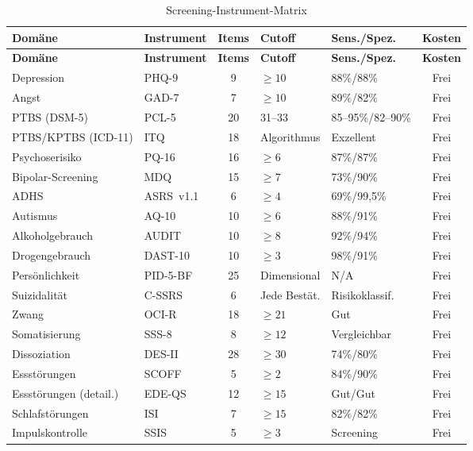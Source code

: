 \documentclass[11pt,a4paper]{article}
\begin{document}
\begin{longtable}{p{2.5cm}p{2.3cm}cp{1.5cm}p{2.5cm}c}
\caption{Screening-Instrument-Matrix} \label{tab:instrumente} \\
\toprule
\textbf{Dom\"ane} & \textbf{Instrument} & \textbf{Items} & \textbf{Cutoff} & \textbf{Sens./Spez.} & \textbf{Kosten} \\
\midrule
\endfirsthead
\toprule
\textbf{Dom\"ane} & \textbf{Instrument} & \textbf{Items} & \textbf{Cutoff} & \textbf{Sens./Spez.} & \textbf{Kosten} \\
\midrule
\endhead
Depression & PHQ-9 & 9 & $\geq 10$ & 88\%/88\% & Frei \\
\addlinespace
Angst & GAD-7 & 7 & $\geq 10$ & 89\%/82\% & Frei \\
\addlinespace
PTBS (DSM-5) & PCL-5 & 20 & 31--33 & 85--95\%/82--90\% & Frei \\
\addlinespace
PTBS/KPTBS (ICD-11) & ITQ & 18 & Algorithmus & Exzellent & Frei \\
\addlinespace
Psychoserisiko & PQ-16 & 16 & $\geq 6$ & 87\%/87\% & Frei \\
\addlinespace
Bipolar-Screening & MDQ & 15 & $\geq 7$ & 73\%/90\% & Frei \\
\addlinespace
ADHS & ASRS~v1.1 & 6 & $\geq 4$ & 69\%/99,5\% & Frei \\
\addlinespace
Autismus & AQ-10 & 10 & $\geq 6$ & 88\%/91\% & Frei \\
\addlinespace
Alkoholgebrauch & AUDIT & 10 & $\geq 8$ & 92\%/94\% & Frei \\
\addlinespace
Drogengebrauch & DAST-10 & 10 & $\geq 3$ & 98\%/91\% & Frei \\
\addlinespace
Pers\"onlichkeit & PID-5-BF & 25 & Dimensional & N/A & Frei \\
\addlinespace
Suizidalit\"at & C-SSRS & 6 & Jede Best\"at. & Risikoklassif. & Frei \\
\addlinespace
Zwang & OCI-R & 18 & $\geq 21$ & Gut & Frei \\
\addlinespace
Somatisierung & SSS-8 & 8 & $\geq 12$ & Vergleichbar & Frei \\
\addlinespace
Dissoziation & DES-II & 28 & $\geq 30$ & 74\%/80\% & Frei \\
\addlinespace
Essst\"orungen & SCOFF & 5 & $\geq 2$ & 84\%/90\% & Frei \\
\addlinespace
Essst\"orungen (detail.) & EDE-QS & 12 & $\geq 15$ & Gut/Gut & Frei \\
\addlinespace
Schlafst\"orungen & ISI & 7 & $\geq 15$ & 82\%/82\% & Frei \\
\addlinespace
Impulskontrolle & SSIS & 5 & $\geq 3$ & Screening & Frei \\
\bottomrule
\end{longtable}
\end{document}
